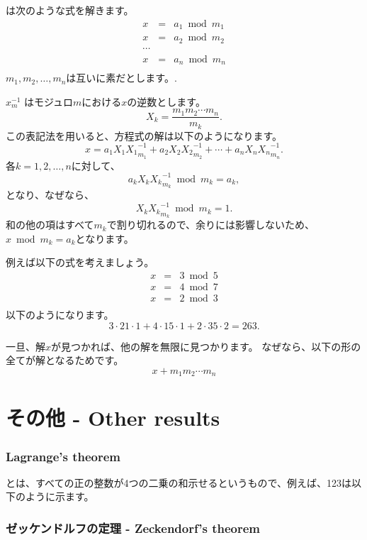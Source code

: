 は次のような式を解きます。
\[
\begin{array}{lcl}
x & = & a_1 \bmod m_1 \\
x & = & a_2 \bmod m_2 \\
\cdots \\
x & = & a_n \bmod m_n \\
\end{array}
\]
$m_1,m_2,\ldots,m_n$は互いに素だとします。.

$x^{-1}_m$ はモジュロ$m$における$x$の逆数とします。
\[ X_k = \frac{m_1 m_2 \cdots m_n}{m_k}.\]
この表記法を用いると、方程式の解は以下のようになります。
\[x = a_1 X_1 {X_1}^{-1}_{m_1} + a_2 X_2 {X_2}^{-1}_{m_2} + \cdots + a_n X_n {X_n}^{-1}_{m_n}.\]
各$k=1,2,\ldots,n$に対して、
\[a_k X_k {X_k}^{-1}_{m_k} \bmod m_k = a_k,\]
となり、なぜなら、
\[X_k {X_k}^{-1}_{m_k} \bmod m_k = 1.\]
和の他の項はすべて$m_k$で割り切れるので、余りには影響しないため、$x \bmod m_k = a_k$となります。

例えば以下の式を考えましょう。
\[
\begin{array}{lcl}
x & = & 3 \bmod 5 \\
x & = & 4 \bmod 7 \\
x & = & 2 \bmod 3 \\
\end{array}
\]
以下のようになります。
\[ 3 \cdot 21 \cdot 1 + 4 \cdot 15 \cdot 1 + 2 \cdot 35 \cdot 2 = 263.\]

一旦、解$x$が見つかれば、他の解を無限に見つかります。
なぜなら、以下の形の全てが解となるためです。
\[x+m_1 m_2 \cdots m_n\]

\section{その他 - Other results}

\subsubsection{Lagrange's theorem}


とは、すべての正の整数が4つの二乗の和示せるというもので、例えば、123は以下のように示ます。

\subsubsection{ゼッケンドルフの定理 - Zeckendorf's theorem}

